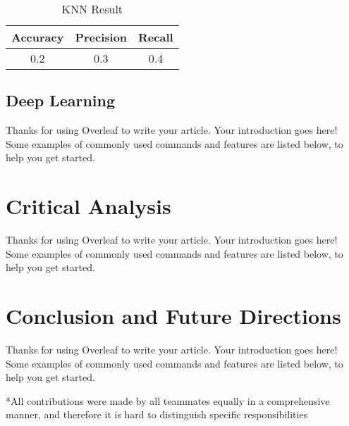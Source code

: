 \documentclass[fleqn,11pt]{olplainarticle}
\begin{document}
\begin{table}[!htbp]
\centering
\caption{KNN Result}\label{tab:knn}
\begin{tabular}{ccc}
\toprule
Accuracy& Precision& Recall\\
\midrule
0.2& 0.3& 0.4\\%
\bottomrule
\end{tabular}
\end{table}



\subsection{Deep Learning}\label{dnn}
Thanks for using Overleaf to write your article. Your introduction goes here! Some examples of commonly used commands and features are listed below, to help you get started.

\section{Critical Analysis}\label{analysis}
Thanks for using Overleaf to write your article. Your introduction goes here! Some examples of commonly used commands and features are listed below, to help you get started.

\section{Conclusion and Future Directions}\label{conclu}
Thanks for using Overleaf to write your article. Your introduction goes here! Some examples of commonly used commands and features are listed below, to help you get started.



\small{*All contributions were made by all teammates equally in a comprehensive manner, and therefore it is hard to distinguish specific responsibilities}
\end{document}
